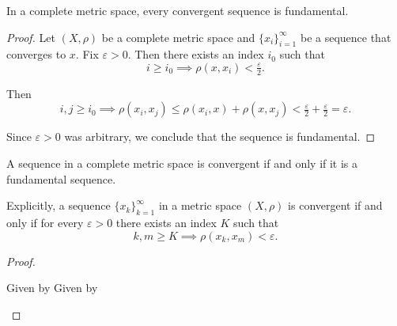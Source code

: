 \begin{proposition}\label{thm:convergent_sequence_is_fundamental}
  In a complete metric space, every convergent sequence is fundamental.
\end{proposition}
\begin{proof}
  Let \( (X, \rho) \) be a complete metric space and \( \{ x_i \}_{i=1}^\infty \) be a sequence that converges to \( x \). Fix \( \varepsilon > 0 \). Then there exists an index \( i_0 \) such that
  \begin{equation*}
    i \geq i_0 \implies \rho(x, x_i) < \tfrac \varepsilon 2.
  \end{equation*}

  Then
  \begin{equation*}
    i, j \geq i_0 \implies \rho(x_i, x_j) \leq \rho(x_i, x) + \rho(x, x_j) < \tfrac \varepsilon 2 + \tfrac \varepsilon 2 = \varepsilon.
  \end{equation*}

  Since \( \varepsilon > 0 \) was arbitrary, we conclude that the sequence is fundamental.
\end{proof}

\begin{corollary}\label{thm:cauchys_convergence_criterion}
  A sequence in a complete metric space is convergent if and only if it is a fundamental sequence.

  Explicitly, a sequence \( \{ x_k \}_{k=1}^\infty \) in a metric space \( (X, \rho) \) is convergent if and only if for every \( \varepsilon > 0 \) there exists an index \( K \) such that
  \begin{equation*}
    k, m \geq K \implies \rho(x_k, x_m) < \varepsilon.
  \end{equation*}
\end{corollary}
\begin{proof}\mbox{}
  \begin{description}
    \Implies Given by 
    \ImpliedBy Given by 
  \end{description}
\end{proof}


